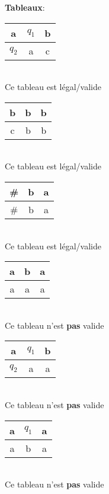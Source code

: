 \documentclass[a4paper,12pt]{article}
\begin{document}
    \textbf{Tableaux}:\\
    \begin{center}
      \begin{minipage}[c]{.4\textwidth}
	\begin{tabular}{|c|c|c|}
	  \hline
	  a     & $q_1$ & b \\ \hline
	  $q_2$ & a     & c \\ \hline
	\end{tabular}\\
	Ce tableau est légal/valide
      \end{minipage}
      \begin{minipage}[c]{.4\textwidth}
	\begin{tabular}{|c|c|c|}
	  \hline
	  b & b & b \\ \hline
	  c & b & b \\ \hline
	\end{tabular}\\
	Ce tableau est légal/valide
      \end{minipage}
      
      \begin{minipage}[c]{.4\textwidth}
	\begin{tabular}{|c|c|c|}
	  \hline
	  \# & b & a \\ \hline
	  \# & b & a \\ \hline
	\end{tabular}\\
	Ce tableau est légal/valide
      \end{minipage}
      \begin{minipage}[c]{.4\textwidth}
	\begin{tabular}{|c|c|c|}
	  \hline
	  a & b & a \\ \hline
	  a & a & a \\ \hline
	\end{tabular}\\
	Ce tableau n'est \textbf{pas} valide
      \end{minipage}
      
      \begin{minipage}[c]{.4\textwidth}
	\begin{tabular}{|c|c|c|}
	  \hline
	  a     & $q_1$ & b \\ \hline
	  $q_2$ & a     & a \\ \hline
	\end{tabular}\\
	Ce tableau n'est \textbf{pas} valide
      \end{minipage}
      \begin{minipage}[c]{.4\textwidth}
	\begin{tabular}{|c|c|c|}
	  \hline
	  a & $q_1$ & a \\ \hline
	  a & b     & a \\ \hline
	\end{tabular}\\
	Ce tableau n'est \textbf{pas} valide
      \end{minipage}
    \end{center}
    
\end{document}
